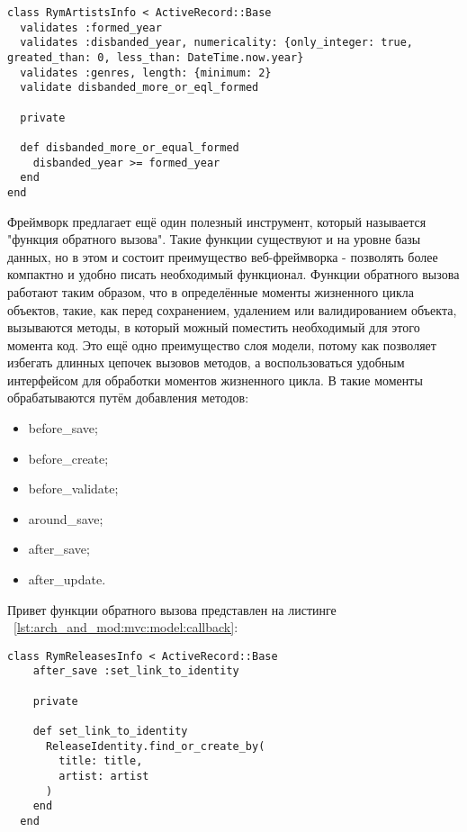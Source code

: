 \begin{lstlisting}[style=fsharpstyle,caption={Реализация валидации в классе RymArtistsInfo}, label=lst:arch_and_mod:mvc:model:rym_artists_info_validations]
class RymArtistsInfo < ActiveRecord::Base
  validates :formed_year
  validates :disbanded_year, numericality: {only_integer: true, greated_than: 0, less_than: DateTime.now.year}
  validates :genres, length: {minimum: 2}
  validate disbanded_more_or_eql_formed

  private

  def disbanded_more_or_equal_formed
    disbanded_year >= formed_year
  end
end
\end{lstlisting}

Фреймворк \ror{} предлагает ещё один полезный инструмент, который называется "функция обратного вызова". Такие функции существуют и на уровне базы данных, но в этом и состоит преимущество веб-фреймворка - позволять более компактно и удобно писать необходимый функционал. Функции обратного вызова работают таким образом, что в определённые моменты жизненного цикла объектов, такие, как перед сохранением, удалением или валидированием объекта, вызываются методы, в который можный поместить необходимый для этого момента код. Это ещё одно преимущество слоя модели, потому как позволяет избегать длинных цепочек вызовов методов, а воспользоваться удобным интерфейсом для обработки моментов жизненного цикла. В \ror{} такие моменты обрабатываются путём добавления методов:
\begin{itemize}
  \item before\_save;
  \item before\_create;
  \item before\_validate;
  \item around\_save;
  \item after\_save;
  \item after\_update.
\end{itemize}

Привет функции обратного вызова представлен на листинге ~\ref{lst:arch_and_mod:mvc:model:callback}:

\begin{lstlisting}[style=fsharpstyle,caption={Пример получения артистов по определённым параметрам}, label=lst:arch_and_mod:mvc:model:callback]
  class RymReleasesInfo < ActiveRecord::Base
    after_save :set_link_to_identity

    private

    def set_link_to_identity
      ReleaseIdentity.find_or_create_by(
        title: title,
        artist: artist
      )
    end
  end
\end{lstlisting}

